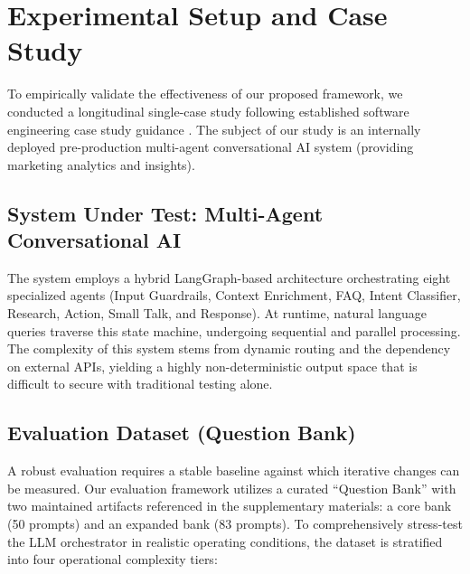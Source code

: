 \section{Experimental Setup and Case Study}
\label{sec:case-study}

To empirically validate the effectiveness of our proposed framework, we conducted a longitudinal single-case study following established software engineering case study guidance \cite{runeson2009guidelines, basili1994gqm}. The subject of our study is an internally deployed pre-production multi-agent conversational AI system (providing marketing analytics and insights).

\subsection{System Under Test: Multi-Agent Conversational AI}
The system employs a hybrid LangGraph-based architecture orchestrating eight specialized agents (Input Guardrails, Context Enrichment, FAQ, Intent Classifier, Research, Action, Small Talk, and Response). At runtime, natural language queries traverse this state machine, undergoing sequential and parallel processing. The complexity of this system stems from dynamic routing and the dependency on external APIs, yielding a highly non-deterministic output space that is difficult to secure with traditional testing alone.

\subsection{Evaluation Dataset (Question Bank)}
A robust evaluation requires a stable baseline against which iterative changes can be measured. Our evaluation framework utilizes a curated ``Question Bank'' with two maintained artifacts referenced in the supplementary materials: a core bank (50 prompts) and an expanded bank (83 prompts). To comprehensively stress-test the LLM orchestrator in realistic operating conditions, the dataset is stratified into four operational complexity tiers:


